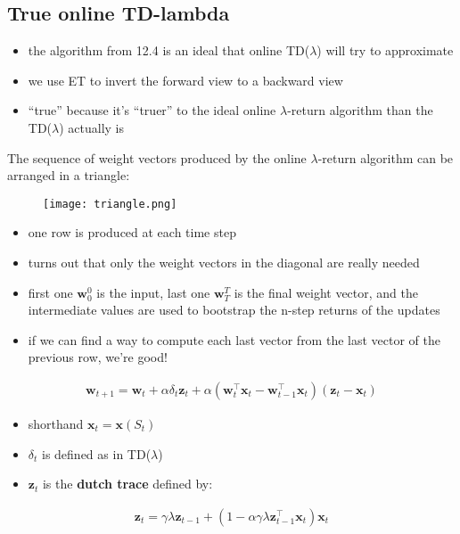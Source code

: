 \documentclass[sutton_barto_notes.tex]{subfiles}
\begin{document}
\subsection{True online TD-lambda}

\begin{itemize}
\item the algorithm from 12.4 is an ideal that online TD($\lambda$) will try to approximate 
\item we use ET to invert the forward view to a backward view 
\item “true” because it’s “truer” to the ideal online $\lambda$-return algorithm than the TD($\lambda$) actually is 
\end{itemize}
 The sequence of weight vectors produced by the online $\lambda$-return algorithm can be arranged in a triangle: 
\begin{figure}[h!]
    \centering
     \texttt{[image: triangle.png]}
\end{figure}

\begin{itemize}
\item one row is produced at each time step 
\item turns out that only the weight vectors in the diagonal are really needed 
\item first one $\mathbf{w}_0^0$ is the input, last one $\mathbf{w}_T^T$ is the final weight vector, and the intermediate values are used to bootstrap the n-step returns of the updates 
\item if we can find a way to compute each last vector from the last vector of the previous row, we’re good! 
\end{itemize}
\begin{align}\mathbf{w}_{t+1} = \mathbf{w}_t + \alpha \delta_t \mathbf{z}_t + \alpha (\mathbf{w}_t^{\top} \mathbf{x}_t - \mathbf{w}_{t-1}^{\top} \mathbf{x}_t) (\mathbf{z}_t - \mathbf{x}_t) \label{eq:12.10}\tag{12.10}\end{align}
\begin{itemize}
\item shorthand $\mathbf{x}_t = \mathbf{x}(S_t)$ 
\item $\delta_t$ is defined as in TD($\lambda$) 
\item $\mathbf{z}_t$ is the \textbf{dutch trace} defined by: 
\end{itemize}
\begin{align}\mathbf{z}_t = \gamma \lambda \mathbf{z}_{t-1} + (1 - \alpha \gamma \lambda \mathbf{z}_{t-1}^{\top} \mathbf{x}_t) \mathbf{x}_t \label{eq:12.11}\tag{12.11}\end{align}
\end{document}
